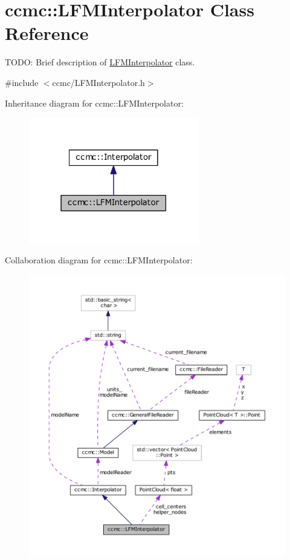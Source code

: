 \hypertarget{classccmc_1_1_l_f_m_interpolator}{\section{ccmc\-:\-:L\-F\-M\-Interpolator Class Reference}
\label{classccmc_1_1_l_f_m_interpolator}
}


T\-O\-D\-O\-: Brief description of \hyperlink{classccmc_1_1_l_f_m_interpolator}{L\-F\-M\-Interpolator} class.  




{\ttfamily \#include $<$ccmc/\-L\-F\-M\-Interpolator.\-h$>$}



Inheritance diagram for ccmc\-:\-:L\-F\-M\-Interpolator\-:
\nopagebreak
\begin{figure}[H]
\begin{center}
\leavevmode
\includegraphics[width=210pt]{classccmc_1_1_l_f_m_interpolator__inherit__graph}
\end{center}
\end{figure}


Collaboration diagram for ccmc\-:\-:L\-F\-M\-Interpolator\-:
\nopagebreak
\begin{figure}[H]
\begin{center}
\leavevmode
\includegraphics[width=350pt]{classccmc_1_1_l_f_m_interpolator__coll__graph}
\end{center}
\end{figure}
